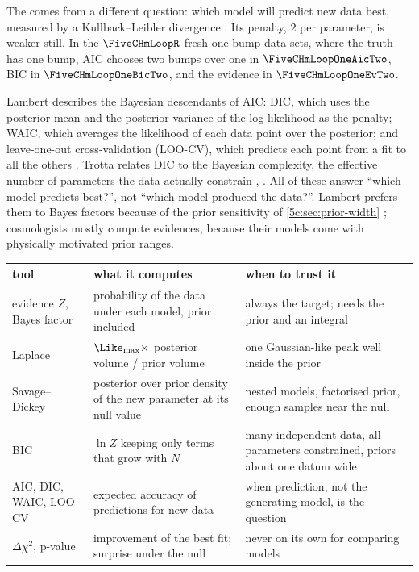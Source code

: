 The  comes from a different question: which model will
predict new data best, measured by a Kullback--Leibler divergence
. Its penalty, $2$ per parameter, is weaker still. In the
$\FiveCHmLoopR$ fresh one-bump data sets, where the truth has one bump, AIC chooses two
bumps over one in $\FiveCHmLoopOneAicTwo$, BIC in $\FiveCHmLoopOneBicTwo$, and the
evidence in $\FiveCHmLoopOneEvTwo$.

Lambert describes the Bayesian descendants of AIC: DIC, which uses the posterior mean
and the posterior variance of the log-likelihood as the penalty; WAIC, which averages
the likelihood of each data point over the posterior; and leave-one-out cross-validation
(LOO-CV), which predicts each point from a fit to all the others
. Trotta relates DIC to the Bayesian complexity, the
effective number of parameters the data actually constrain \cite[\S4.6]{Trotta2008},
. All of these answer ``which model predicts
best?'', not ``which model produced the data?''. Lambert prefers them to Bayes factors
because of the prior sensitivity of \cref{5c:sec:prior-width}
; cosmologists mostly compute evidences, because their models
come with physically motivated prior ranges.

\begin{taxonomy}
\small
\renewcommand{\arraystretch}{1.12}
\begin{tabularx}{\linewidth}{@{}>{\raggedright\arraybackslash}p{2.6cm}
                               >{\raggedright\arraybackslash}X
                               >{\raggedright\arraybackslash}p{3.6cm}@{}}
\toprule
tool & what it computes & when to trust it\\\midrule
evidence $Z$, Bayes factor & probability of the data under each model, prior included & always the target; needs the prior and an integral\\
Laplace & $\Like_{\max}\times$ posterior volume / prior volume & one Gaussian-like peak well inside the prior\\
Savage--Dickey & posterior over prior density of the new parameter at its null value & nested models, factorised prior, enough samples near the null\\
BIC & $\ln Z$ keeping only terms that grow with $N$ & many independent data, all parameters constrained, priors about one datum wide\\
AIC, DIC, WAIC, LOO-CV & expected accuracy of predictions for new data & when prediction, not the generating model, is the question\\
$\Delta\chi^2$, p-value & improvement of the best fit; surprise under the null & never on its own for comparing models\\
\bottomrule
\end{tabularx}
\end{taxonomy}

